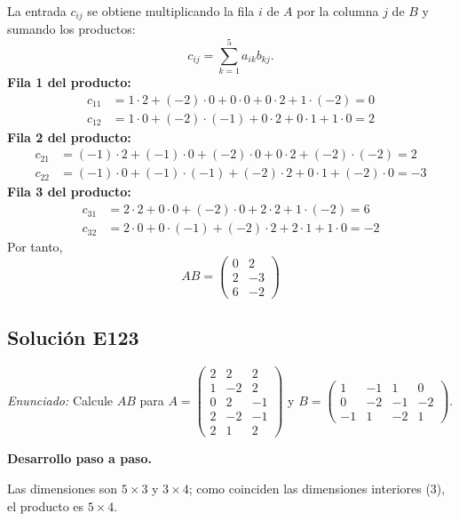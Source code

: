 \documentclass[12pt]{article}
\theoremstyle{remark}
\newcommand{\solucion}[2]{\Needspace{11\baselineskip}\subsection*{Solución E#1}\noindent\textit{Enunciado:} #2\par\medskip\noindent\textbf{Desarrollo paso a paso.}\par\medskip}
\begin{document}
La entrada $c_{ij}$ se obtiene multiplicando la fila $i$ de $A$ por la columna $j$ de $B$ y sumando los productos:
\[
c_{ij}=\sum_{k=1}^{5} a_{ik}b_{kj}.
\]
\textbf{Fila 1 del producto:}
\[
\begin{aligned}c_{11}&=1\cdot 2+(-2)\cdot 0+0\cdot 0+0\cdot 2+1\cdot (-2)=0\\c_{12}&=1\cdot 0+(-2)\cdot (-1)+0\cdot 2+0\cdot 1+1\cdot 0=2\end{aligned}
\]
\textbf{Fila 2 del producto:}
\[
\begin{aligned}c_{21}&=(-1)\cdot 2+(-1)\cdot 0+(-2)\cdot 0+0\cdot 2+(-2)\cdot (-2)=2\\c_{22}&=(-1)\cdot 0+(-1)\cdot (-1)+(-2)\cdot 2+0\cdot 1+(-2)\cdot 0=-3\end{aligned}
\]
\textbf{Fila 3 del producto:}
\[
\begin{aligned}c_{31}&=2\cdot 2+0\cdot 0+(-2)\cdot 0+2\cdot 2+1\cdot (-2)=6\\c_{32}&=2\cdot 0+0\cdot (-1)+(-2)\cdot 2+2\cdot 1+1\cdot 0=-2\end{aligned}
\]
Por tanto,
\[
\boxed{AB=\begin{pmatrix}0&2\\2&-3\\6&-2\end{pmatrix}}
\]

\medskip

\solucion{123}{Calcule $AB$ para $A=\begin{pmatrix}2&2&2\\1&-2&2\\0&2&-1\\2&-2&-1\\2&1&2\end{pmatrix}$ y $B=\begin{pmatrix}1&-1&1&0\\0&-2&-1&-2\\-1&1&-2&1\end{pmatrix}$.}
Las dimensiones son $5\times3$ y $3\times4$; como coinciden las dimensiones interiores (3), el producto es $5\times4$.
\end{document}
